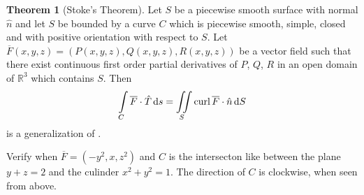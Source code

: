 \documentclass[fleqn, a4paper, 12pt, twoside]{article}
\theoremstyle{definition}
\theoremstyle{theorem}
\newtheorem{theorem}{Theorem}
\newcommand{\curl}{\mathrm{curl\,}}
\begin{document}
{\begin{theorem}[Stoke's Theorem]
	Let $S$ be a piecewise smooth surface with normal $\hat{n}$ and let $S$ be bounded by a curve $C$ which is piecewise smooth, simple, closed and with positive orientation with respect to $S$.
	Let $\overline{F}(x,y,z) = \left( P(x,y,z), Q(x,y,z), R(x,y,z) \right)$ be a vector field such that there exist continuous first order partial derivatives of $P$, $Q$, $R$ in an open domain of $\mathbb{R}^3$ which contains $S$.
	Then 
	\begin{equation*}
		\int\limits_{C} \overline{F} \cdot \hat{T} \dif s = \iint\limits_{S} \curl \overline{F} \cdot \hat{n} \dif S
	\end{equation*}
	 is a generalization of .
	\label{Stoke's_Theorem}
\end{theorem}

\begin{question}
	Verify  when $\overline{F} = \left( -y^2 , x , z^2 \right)$ and $C$ is the intersecton like between the plane $y + z = 2$ and the culinder $x^2 + y^2 = 1$.
	The direction of $C$ is clockwise, when seen from above.
\end{question}

}
\end{document}
